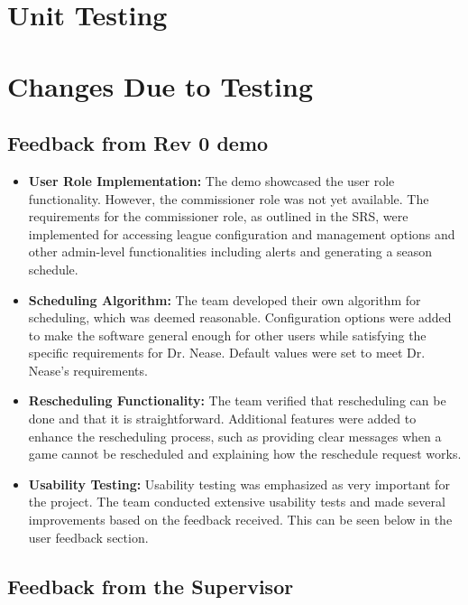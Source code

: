 \documentclass[12pt, titlepage]{article}
\begin{document}
\section{Unit Testing}

\section{Changes Due to Testing}


\subsection{Feedback from Rev 0 demo}

\begin{itemize}
  \item \textbf{User Role Implementation:} The demo showcased the user role functionality. However,
  the commissioner role was not yet available. The requirements for the commissioner role, as
  outlined in the SRS, were implemented for accessing league configuration and management options and
  other admin-level functionalities including alerts and generating a season schedule.
  \item \textbf{Scheduling Algorithm:} The team developed their own algorithm for scheduling, which was
  deemed reasonable. Configuration options were added to make the software general enough for other
  users while satisfying the specific requirements for Dr. Nease. Default values were set to meet
  Dr. Nease's requirements.
  \item \textbf{Rescheduling Functionality:} The team verified that rescheduling can be done and that it
  is straightforward. Additional features were added to enhance the rescheduling process, such as
  providing clear messages when a game cannot be rescheduled and explaining how the reschedule
  request works.
  \item \textbf{Usability Testing:} Usability testing was emphasized as very important for the
  project. The team conducted extensive usability tests and made several improvements based on the
  feedback received. This can be seen below in the user feedback section.
\end{itemize}

\subsection{Feedback from the Supervisor}
\end{document}
